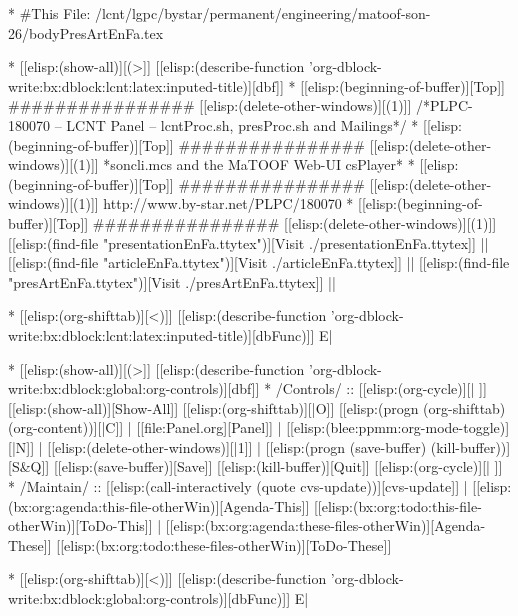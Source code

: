 
\begin{whenOrg}
*  #This File: /lcnt/lgpc/bystar/permanent/engineering/matoof-son-26/bodyPresArtEnFa.tex
\end{whenOrg}

\begin{whenOrg}
* [[elisp:(show-all)][(>]] [[elisp:(describe-function 'org-dblock-write:bx:dblock:lcnt:latex:inputed-title)][dbf]]
*  [[elisp:(beginning-of-buffer)][Top]] ################  [[elisp:(delete-other-windows)][(1)]]   /*PLPC-180070 -- LCNT Panel -- lcntProc.sh, presProc.sh and Mailings*/
*  [[elisp:(beginning-of-buffer)][Top]] ################  [[elisp:(delete-other-windows)][(1)]]   *soncli.mcs and the MaTOOF Web-UI csPlayer*
*  [[elisp:(beginning-of-buffer)][Top]] ################  [[elisp:(delete-other-windows)][(1)]]   http://www.by-star.net/PLPC/180070
*  [[elisp:(beginning-of-buffer)][Top]] ################  [[elisp:(delete-other-windows)][(1)]]   [[elisp:(find-file "presentationEnFa.ttytex")][Visit ./presentationEnFa.ttytex]] || [[elisp:(find-file "articleEnFa.ttytex")][Visit ./articleEnFa.ttytex]] || [[elisp:(find-file "presArtEnFa.ttytex")][Visit ./presArtEnFa.ttytex]] ||

* [[elisp:(org-shifttab)][<)]] [[elisp:(describe-function 'org-dblock-write:bx:dblock:lcnt:latex:inputed-title)][dbFunc)]]  E|
\end{whenOrg}

\begin{whenOrg}
* [[elisp:(show-all)][(>]] [[elisp:(describe-function 'org-dblock-write:bx:dblock:global:org-controls)][dbf]]
*  /Controls/ ::  [[elisp:(org-cycle)][| ]]  [[elisp:(show-all)][Show-All]]  [[elisp:(org-shifttab)][|O]]  [[elisp:(progn (org-shifttab) (org-content))][|C]] | [[file:Panel.org][Panel]] | [[elisp:(blee:ppmm:org-mode-toggle)][|N]] | [[elisp:(delete-other-windows)][|1]] | [[elisp:(progn (save-buffer) (kill-buffer))][S&Q]]  [[elisp:(save-buffer)][Save]]  [[elisp:(kill-buffer)][Quit]] [[elisp:(org-cycle)][| ]]
*  /Maintain/ ::  [[elisp:(call-interactively (quote cvs-update))][cvs-update]] | [[elisp:(bx:org:agenda:this-file-otherWin)][Agenda-This]] [[elisp:(bx:org:todo:this-file-otherWin)][ToDo-This]] | [[elisp:(bx:org:agenda:these-files-otherWin)][Agenda-These]] [[elisp:(bx:org:todo:these-files-otherWin)][ToDo-These]]

* [[elisp:(org-shifttab)][<)]] [[elisp:(describe-function 'org-dblock-write:bx:dblock:global:org-controls)][dbFunc)]]  E|
\end{whenOrg}

